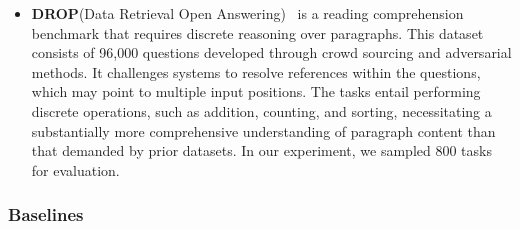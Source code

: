 \begin{itemize}[left=0pt]
    \item \textbf{DROP}(Data Retrieval Open Answering)~\cite{dua-etal-2019-drop} is a reading comprehension benchmark that requires discrete reasoning over paragraphs. This dataset consists of 96,000 questions developed through crowd sourcing and adversarial methods. It challenges systems to resolve references within the questions, which may point to multiple input positions. The tasks entail performing discrete operations, such as addition, counting, and sorting, necessitating a substantially more comprehensive understanding of paragraph content than that demanded by prior datasets. In our experiment, we sampled 800 tasks for evaluation.
\end{itemize}


\subsubsection{Baselines}
\label{appendix:baselines}
